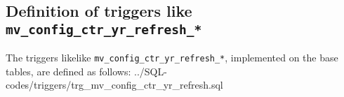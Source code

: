 \subsection{Definition of triggers like \texttt{mv\_config\_ctr\_yr\_refresh\_*}}\label{subsec_appx_trg_mv_config_ctr_yr_refresh}

The triggers likelike \texttt{mv\_config\_ctr\_yr\_refresh\_*}, implemented on the base tables, are defined as follows:
%
{../SQL-codes/triggers/trg_mv_config_ctr_yr_refresh.sql}
